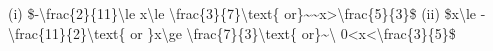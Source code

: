 \item (i) \$-\textbackslash frac\{2\}\{11\}\textbackslash le x\textbackslash le
\textbackslash frac\{3\}\{7\}\textbackslash text\{ or\}\textasciitilde\textasciitilde x>\textbackslash frac\{5\}\{3\}\$
(ii) \$x\textbackslash le -\textbackslash frac\{11\}\{2\}\textbackslash text\{
or \}x\textbackslash ge \textbackslash frac\{7\}\{3\}\textbackslash text\{
or\}\textasciitilde\textbackslash{} 0<x<\textbackslash frac\{3\}\{5\}\$